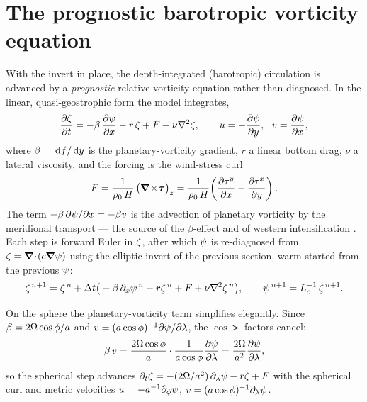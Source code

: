 \section{The prognostic barotropic vorticity equation}

With the invert in place, the depth-integrated (barotropic) circulation is advanced by a
\emph{prognostic} relative-vorticity equation rather than diagnosed. In the linear,
quasi-geostrophic form the model integrates,
\begin{equation}\label{eq:barotropic}
  \frac{\partial \zeta}{\partial t}=-\beta\,\frac{\partial \psi}{\partial x}-r\,\zeta+F+\nu\nabla^{2}\zeta,
  \qquad u=-\frac{\partial \psi}{\partial y},\ \ v=\frac{\partial \psi}{\partial x},
\end{equation}
where $\beta=\,\mathrm{d} f/\,\mathrm{d} y$ is the planetary-vorticity gradient, $r$ a linear bottom drag, $\nu$ a
lateral viscosity, and the forcing is the wind-stress curl
\begin{equation}
  F=\frac{1}{\rho_0\,H}\,\big(\boldsymbol{\nabla}\!\times\!\boldsymbol{\tau}\big)_z
   =\frac{1}{\rho_0\,H}\!\left(\frac{\partial \tau^{y}}{\partial x}-\frac{\partial \tau^{x}}{\partial y}\right).
\end{equation}
The term $-\beta\,\partial\psi/\partial x=-\beta v$ is the advection of planetary vorticity by
the meridional transport --- the source of the $\beta$-effect and of western intensification
\citep{vallis2017}. Each step is forward Euler in $\zeta$, after which $\psi$ is re-diagnosed
from $\zeta=\boldsymbol{\nabla}\!\cdot\!(c\boldsymbol{\nabla}\psi)$ using the elliptic invert of the previous section, warm-started
from the previous $\psi$:
\begin{equation}
  \zeta^{\,n+1}=\zeta^{\,n}+\Delta t\big(-\beta\,\partial_x\psi^{\,n}-r\zeta^{\,n}+F+\nu\nabla^{2}\zeta^{\,n}\big),
  \qquad \psi^{\,n+1}=L^{-1}_{c}\,\zeta^{\,n+1}.
\end{equation}

On the sphere the planetary-vorticity term simplifies elegantly. Since $\beta=2\Omega\cos\phi/a$
and $v=(a\cos\phi)^{-1}\partial\psi/\partial\lambda$, the $\cos\lat$ factors cancel:
\begin{equation}\label{eq:beta-sphere}
  \beta\,v=\frac{2\Omega\cos\phi}{a}\cdot\frac{1}{a\cos\phi}\frac{\partial \psi}{\partial \lambda}
          =\frac{2\Omega}{a^{2}}\frac{\partial \psi}{\partial \lambda},
\end{equation}
so the spherical step advances $\partial_t\zeta=-(2\Omega/a^{2})\,\partial_\lambda\psi-r\zeta+F$
with the spherical curl and metric velocities $u=-a^{-1}\partial_\phi\psi$,
$v=(a\cos\phi)^{-1}\partial_\lambda\psi$.

